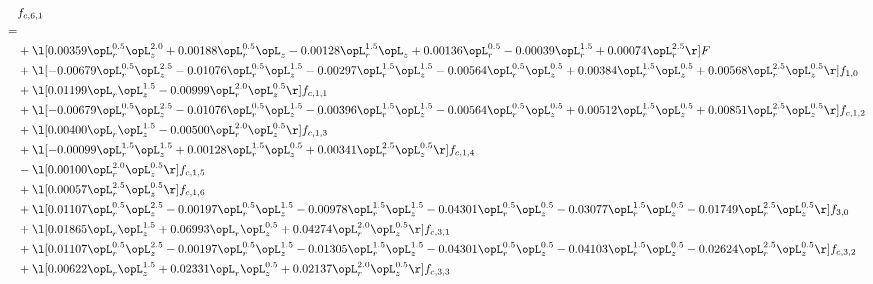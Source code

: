 \begin{alignat}{2} 
\label{eq:f_61_1} 
& f_{c,6,1} \nonumber \\ 
 = \\ 
& + \l[  0.00359 \opL_r^{0.5} \opL_z^{2.0} +  0.00188 \opL_r^{0.5} \opL_z   -0.00128 \opL_r^{1.5} \opL_z +  0.00136 \opL_r^{0.5}   -0.00039 \opL_r^{1.5} +  0.00074 \opL_r^{2.5}  \r] F \nonumber \\ 
& + \l[  -0.00679 \opL_r^{0.5} \opL_z^{2.5}   -0.01076 \opL_r^{0.5} \opL_z^{1.5}   -0.00297 \opL_r^{1.5} \opL_z^{1.5}   -0.00564 \opL_r^{0.5} \opL_z^{0.5} +  0.00384 \opL_r^{1.5} \opL_z^{0.5} +  0.00568 \opL_r^{2.5} \opL_z^{0.5}  \r] f_{1,0} \nonumber \\ 
& + \l[  0.01199 \opL_r \opL_z^{1.5}   -0.00999 \opL_r^{2.0} \opL_z^{0.5}  \r] f_{c,1,1} \nonumber \\ 
& + \l[  -0.00679 \opL_r^{0.5} \opL_z^{2.5}   -0.01076 \opL_r^{0.5} \opL_z^{1.5}   -0.00396 \opL_r^{1.5} \opL_z^{1.5}   -0.00564 \opL_r^{0.5} \opL_z^{0.5} +  0.00512 \opL_r^{1.5} \opL_z^{0.5} +  0.00851 \opL_r^{2.5} \opL_z^{0.5}  \r] f_{c,1,2} \nonumber \\ 
& + \l[  0.00400 \opL_r \opL_z^{1.5}   -0.00500 \opL_r^{2.0} \opL_z^{0.5}  \r] f_{c,1,3} \nonumber \\ 
& + \l[  -0.00099 \opL_r^{1.5} \opL_z^{1.5} +  0.00128 \opL_r^{1.5} \opL_z^{0.5} +  0.00341 \opL_r^{2.5} \opL_z^{0.5}  \r] f_{c,1,4} \nonumber \\ 
& - \l[  0.00100 \opL_r^{2.0} \opL_z^{0.5}  \r] f_{c,1,5} \nonumber \\ 
& + \l[  0.00057 \opL_r^{2.5} \opL_z^{0.5}  \r] f_{c,1,6} \nonumber \\ 
& + \l[  0.01107 \opL_r^{0.5} \opL_z^{2.5}   -0.00197 \opL_r^{0.5} \opL_z^{1.5}   -0.00978 \opL_r^{1.5} \opL_z^{1.5}   -0.04301 \opL_r^{0.5} \opL_z^{0.5}   -0.03077 \opL_r^{1.5} \opL_z^{0.5}   -0.01749 \opL_r^{2.5} \opL_z^{0.5}  \r] f_{3,0} \nonumber \\ 
& + \l[  0.01865 \opL_r \opL_z^{1.5} +  0.06993 \opL_r \opL_z^{0.5} +  0.04274 \opL_r^{2.0} \opL_z^{0.5}  \r] f_{c,3,1} \nonumber \\ 
& + \l[  0.01107 \opL_r^{0.5} \opL_z^{2.5}   -0.00197 \opL_r^{0.5} \opL_z^{1.5}   -0.01305 \opL_r^{1.5} \opL_z^{1.5}   -0.04301 \opL_r^{0.5} \opL_z^{0.5}   -0.04103 \opL_r^{1.5} \opL_z^{0.5}   -0.02624 \opL_r^{2.5} \opL_z^{0.5}  \r] f_{c,3,2} \nonumber \\ 
& + \l[  0.00622 \opL_r \opL_z^{1.5} +  0.02331 \opL_r \opL_z^{0.5} +  0.02137 \opL_r^{2.0} \opL_z^{0.5}  \r] f_{c,3,3} \nonumber \\ 

\end{alignat}
